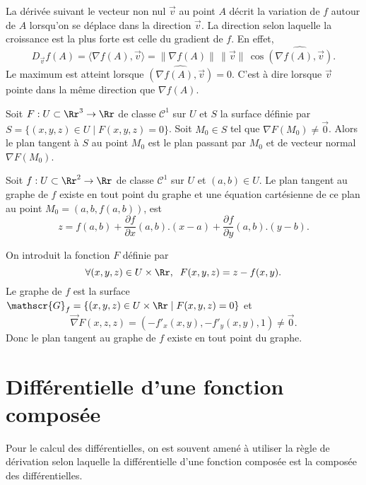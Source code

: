 \documentclass[class=report,crop=false]{standalone}
\begin{document}
\vskip6mm

La dérivée suivant le vecteur non nul $\vec{v}$ au point $A$ décrit la variation de $f$ autour de $A$ lorsqu'on se déplace dans la direction $\vec{v}$. La direction selon laquelle la croissance est la plus forte est celle du gradient de $f$. En effet,
$$D_{\vec{v}}f(A)=\langle \nabla f(A),\vec{v}\rangle=\| \nabla f(A)\|\, \| \vec{v}\|\, \cos \widehat{\left(\nabla f(A),\vec{v}\right)}.$$
Le maximum est atteint lorsque $\widehat{\left(\nabla f(A),\vec{v}\right)}=0$. C'est à dire lorsque $\displaystyle \vec{v}$ pointe dans la m\^eme direction que $\nabla f(A)$.

\vskip6mm

\begin{definition}Soit $F:U\subset \Rr^3\to \Rr$ de classe $\mathscr{C}^1$ sur $U$ et $S$ la surface définie par $S=\{(x,y,z)\in U\mid F(x,y,z)=0\}$. Soit $M_0\in S$ tel que $\nabla F(M_0)\neq \vec{0}$. Alors le plan tangent à $S$ au point $M_0$ est le plan passant par $M_0$ et de vecteur normal $\nabla F(M_0)$.
\end{definition}

\vskip6mm

\begin{proposition}Soit $f:U\subset \Rr^2\to \Rr$ de classe $\mathscr{C}^1$ sur $U$ et $(a,b)\in U$. Le plan tangent au graphe de $f$ existe en tout point du graphe et une équation cartésienne de ce plan au point $M_0=(a,b,f(a,b))$, est
$$\displaystyle z=f(a,b)+\frac{\partial f}{\partial x}(a,b).(x-a)+\frac{\partial f}{\partial y}(a,b).(y-b).$$
\end{proposition}

\vskip4mm

On introduit la fonction $F$ définie par
$$\forall (x,y,z)\in U\times \Rr,\;\; F(x,y,z)=z-f(x,y).$$
Le graphe de $f$ est la surface $\mathscr{G}_f=\{(x,y,z)\in U\times \Rr\mid F(x,y,z)=0\}$ et
$$\overrightarrow{\nabla}F(x,z,z)=(-f'_x(x,y),-f'_y(x,y),1)\neq \vec{0}.$$
Donc le plan tangent au graphe de $f$ existe en tout point du graphe.

\vskip8mm

\section{Différentielle d'une fonction composée}

\vskip4mm

\noindent Pour le calcul des différentielles, on est souvent amené à utiliser la règle de dérivation selon laquelle la différentielle d'une fonction composée est la composée des différentielles.
\end{document}

